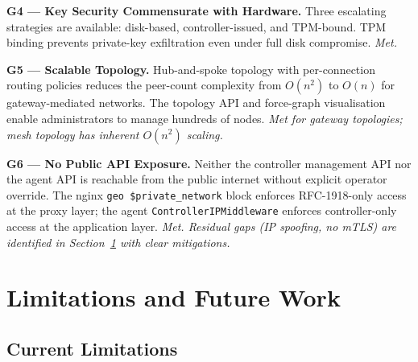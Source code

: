 \documentclass[conference]{IEEEtran}
\begin{document}
\textbf{G4 — Key Security Commensurate with Hardware.} Three escalating strategies
are available: disk-based, controller-issued, and TPM-bound. TPM binding prevents
private-key exfiltration even under full disk compromise. \textit{Met.}

\textbf{G5 — Scalable Topology.} Hub-and-spoke topology with per-connection routing
policies reduces the peer-count complexity from $O(n^2)$ to $O(n)$ for
gateway-mediated networks. The topology API and force-graph visualisation enable
administrators to manage hundreds of nodes. \textit{Met for gateway topologies;
mesh topology has inherent $O(n^2)$ scaling.}

\textbf{G6 — No Public API Exposure.} Neither the controller management API nor the
agent API is reachable from the public internet without explicit operator override.
The nginx \texttt{geo \$private\_network} block enforces RFC-1918-only access at
the proxy layer; the agent \texttt{ControllerIPMiddleware} enforces controller-only
access at the application layer. \textit{Met. Residual gaps (IP spoofing, no mTLS)
are identified in Section~\ref{sec:limitations} with clear mitigations.}


\section{Limitations and Future Work}
\label{sec:limitations}

\subsection{Current Limitations}
\end{document}
